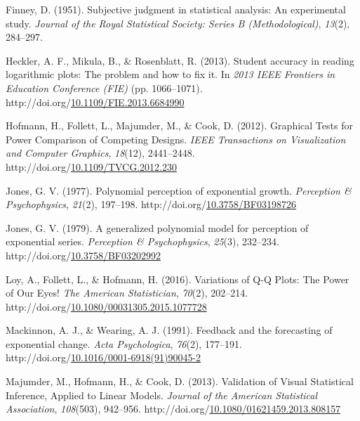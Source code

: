 \documentclass[print]{nuthesis}
\newlength{\cslhangindent}
\newenvironment{CSLReferences}%
{\setlength{\parindent}{0pt}%
\everypar{\setlength{\hangindent}{\cslhangindent}}\ignorespaces}%
{\par}
\begin{document}
\begin{CSLReferences}{1}{0}
\leavevmode\hypertarget{ref-finney1951subjective}{}%
Finney, D. (1951). Subjective judgment in statistical analysis: An experimental study. \emph{Journal of the Royal Statistical Society: Series B (Methodological)}, \emph{13}(2), 284--297.

\leavevmode\hypertarget{ref-heckler_student_2013}{}%
Heckler, A. F., Mikula, B., \& Rosenblatt, R. (2013). Student accuracy in reading logarithmic plots: {The} problem and how to fix it. In \emph{2013 {IEEE} {Frontiers} in {Education} {Conference} ({FIE})} (pp. 1066--1071). http://doi.org/\href{https://doi.org/10.1109/FIE.2013.6684990}{10.1109/FIE.2013.6684990}

\leavevmode\hypertarget{ref-hofmann_graphical_2012}{}%
Hofmann, H., Follett, L., Majumder, M., \& Cook, D. (2012). Graphical {Tests} for {Power} {Comparison} of {Competing} {Designs}. \emph{IEEE Transactions on Visualization and Computer Graphics}, \emph{18}(12), 2441--2448. http://doi.org/\href{https://doi.org/10.1109/TVCG.2012.230}{10.1109/TVCG.2012.230}

\leavevmode\hypertarget{ref-jones_polynomial_1977}{}%
Jones, G. V. (1977). Polynomial perception of exponential growth. \emph{Perception \& Psychophysics}, \emph{21}(2), 197--198. http://doi.org/\href{https://doi.org/10.3758/BF03198726}{10.3758/BF03198726}

\leavevmode\hypertarget{ref-jones_generalized_1979}{}%
Jones, G. V. (1979). A generalized polynomial model for perception of exponential series. \emph{Perception \& Psychophysics}, \emph{25}(3), 232--234. http://doi.org/\href{https://doi.org/10.3758/BF03202992}{10.3758/BF03202992}

\leavevmode\hypertarget{ref-loyVariationsQQPlots2016}{}%
Loy, A., Follett, L., \& Hofmann, H. (2016). Variations of {Q}-{Q} {Plots}: {The} {Power} of {Our} {Eyes}! \emph{The American Statistician}, \emph{70}(2), 202--214. http://doi.org/\href{https://doi.org/10.1080/00031305.2015.1077728}{10.1080/00031305.2015.1077728}

\leavevmode\hypertarget{ref-mackinnon_feedback_1991}{}%
Mackinnon, A. J., \& Wearing, A. J. (1991). Feedback and the forecasting of exponential change. \emph{Acta Psychologica}, \emph{76}(2), 177--191. http://doi.org/\href{https://doi.org/10.1016/0001-6918(91)90045-2}{10.1016/0001-6918(91)90045-2}

\leavevmode\hypertarget{ref-majumder_validation_2013}{}%
Majumder, M., Hofmann, H., \& Cook, D. (2013). Validation of {Visual} {Statistical} {Inference}, {Applied} to {Linear} {Models}. \emph{Journal of the American Statistical Association}, \emph{108}(503), 942--956. http://doi.org/\href{https://doi.org/10.1080/01621459.2013.808157}{10.1080/01621459.2013.808157}


\end{CSLReferences}
\end{document}
